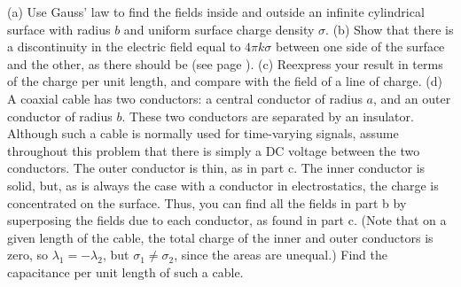         (a) Use Gauss' law to find the fields inside and outside an
        infinite cylindrical surface with radius $b$ and uniform
        surface charge density $\sigma$.\answercheck\hwendpart
        (b) Show that there is a discontinuity in the electric field equal to $4\pi k \sigma$
        between one side of the surface and the other, as there should be (see page \pageref{e-discontinuity}).\hwendpart
         (c) Reexpress your result in terms of the charge per unit
         length, and compare with the field of a line of charge.\hwendpart
        (d) A coaxial cable has two conductors:
        a central conductor of radius $a$, and an outer conductor of
        radius $b$. These two conductors are separated by an insulator.
        Although such a cable is normally used for time-varying signals,
        assume throughout this problem that there is simply a DC voltage
        between the two conductors.
        The outer conductor is thin, as in part c. The inner
        conductor is solid, but, as is always the case with a conductor in electrostatics,
        the charge is concentrated on the surface. Thus, you can 
        find all the fields in part b by superposing the fields due
        to each conductor, as found in part c. (Note that on a given length of the cable,
        the total charge of the inner and outer conductors is zero, so $\lambda_1=-\lambda_2$,
        but $\sigma_1\ne\sigma_2$, since the areas are unequal.)
        Find the capacitance per unit length of such a cable.\answercheck
